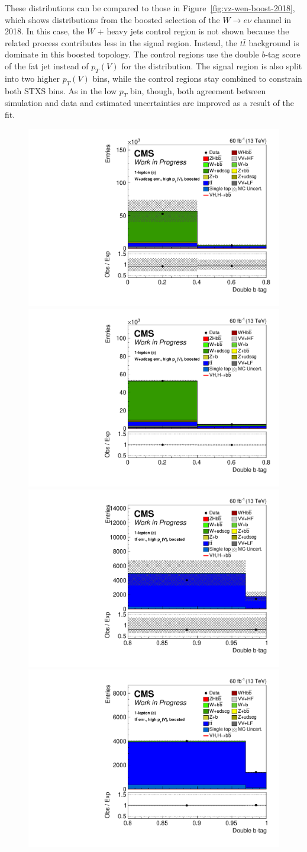 %
These distributions can be compared to those in Figure~\ref{fig:vz-wen-boost-2018},
which shows distributions from the boosted selection of the $W\rightarrow e\nu$ channel in 2018.
In this case, the $W$ + heavy jets control region is not shown because the related process contributes less
in the signal region.
Instead, the $t\bar{t}$ background is dominate in this boosted topology.
The control regions use the double $b$-tag score of the fat jet instead of $p_T(V)$ for the distribution.
The signal region is also split into two higher $p_T(V)$ bins, while the control regions stay combined
to constrain both STXS bins.
As in the low $p_T$ bin, though, both agreement between simulation and data and estimated uncertainties
are improved as a result of the fit.
%
\begin{figure}
  \centering
  \includegraphics[width=0.35\linewidth]{figures/210323_STXS_VZ_unblinded_XbbVZ_8fe9e9cd_postfitplots/plot_shapes_vhbb_Wen_18_13TeV2018_prefit}
  \includegraphics[width=0.35\linewidth]{figures/210323_STXS_VZ_unblinded_XbbVZ_8fe9e9cd_postfitplots/plot_shapes_vhbb_Wen_18_13TeV2018_postfit} \\
  \includegraphics[width=0.35\linewidth]{figures/210323_STXS_VZ_unblinded_XbbVZ_8fe9e9cd_postfitplots/plot_shapes_vhbb_Wen_20_13TeV2018_prefit}
  \includegraphics[width=0.35\linewidth]{figures/210323_STXS_VZ_unblinded_XbbVZ_8fe9e9cd_postfitplots/plot_shapes_vhbb_Wen_20_13TeV2018_postfit} \\

\end{figure}
